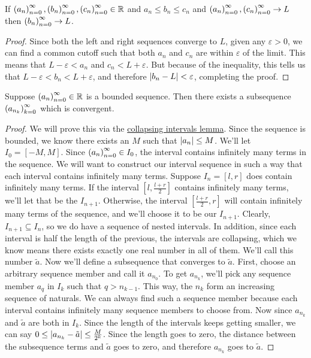 \begin{theorem}
If $\seq{a},\seq{b},\seq{c} \in \mathbb{R}$ and $a_n \leq b_n \leq c_n$ and $\seq{a}, \seq{c} \to L$ then $\seq{b} \to L$.
\end{theorem}
\begin{proof}
Since both the left and right sequences converge to $L$, given any $\varepsilon > 0$, we can find a common cutoff such that both $a_n$ and $c_n$ are within $\varepsilon$ of the limit. This means that $L-\varepsilon < a_n$ and $c_n < L+\varepsilon$. But because of the inequality, this tells us that $L-\varepsilon < b_n < L+\varepsilon$, and therefore $\left\lvert b_n - L \right\rvert < \varepsilon$, completing the proof.
\end{proof}
\begin{theorem}
Suppose $\seq{a} \in \mathbb{R}$ is a bounded sequence. Then there exists a subsequence $\seq{a}[n_k][k]$ which is convergent. 
\end{theorem}
\begin{proof}
We will prove this via the \hyperlink{Collapsing Intervals Lemma}{collapsing intervals lemma}. Since the sequence is bounded, we know there exists an $M$ such that $\left\lvert a_n \right\rvert \leq M$. We'll let $I_0 = [-M, M]$. Since $\seq{a} \in I_0$, the interval contains infinitely many terms in the sequence. We will want to construct our interval sequence in such a way that each interval contains infinitely many terms. Suppose $I_n = [l, r]$ does contain infinitely many terms. If the interval $[l, \frac{l+r}{2}]$ contains infinitely many terms, we'll let that be the $I_{n+1}$. Otherwise, the interval $[\frac{l+r}{2}, r]$ will contain infinitely many terms of the sequence, and we'll choose it to be our $I_{n+1}$. Clearly, $I_{n+1} \subseteq I_n$, so we do have a sequence of nested intervals. In addition, since each interval is half the length of the previous, the intervals are collapsing, which we know means there exists exactly one real number in all of them. We'll call this number $\tilde{a}$. Now we'll define a subsequence that converges to $\tilde{a}$.
First, choose an arbitrary sequence member and call it $a_{n_0}$. To get $a_{n_k}$, we'll pick any sequence member $a_q$ in $I_k$ such that $q > n_{k-1}$. This way, the $n_k$ form an increasing sequence of naturals. We can always find such a sequence member because each interval contains infinitely many sequence members to choose from. Now since $a_{n_k}$ and $\tilde{a}$ are both in $I_k$. Since the length of the intervals keeps getting smaller, we can say $0 \leq \left\lvert a_{n_k} - \tilde{a} \right\rvert \leq \frac{M}{2^k}$. Since the length goes to zero, the distance between the subsequence terms and $\tilde{a}$ goes to zero, and therefore $a_{n_k}$ goes to $\tilde{a}$.
\end{proof}
